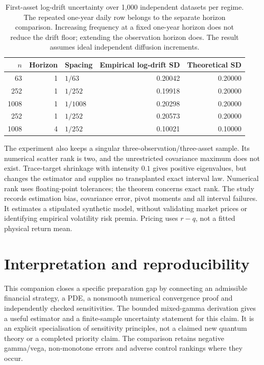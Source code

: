 \documentclass[11pt]{article}
\begin{document}
\begin{table}[tb]\centering\small
\begin{tabular}{rrlrr}\toprule
$n$ & Horizon & Spacing & Empirical log-drift SD & Theoretical SD\\\midrule
63 & 1 & $1/63$ & 0.20042 & 0.20000 \\
252 & 1 & $1/252$ & 0.19918 & 0.20000 \\
1008 & 1 & $1/1008$ & 0.20298 & 0.20000 \\
252 & 1 & $1/252$ & 0.20573 & 0.20000 \\
1008 & 4 & $1/252$ & 0.10021 & 0.10000 \\
\bottomrule\end{tabular}
\caption{First-asset log-drift uncertainty over 1,000 independent datasets per regime. The repeated one-year daily row belongs to the separate horizon comparison. Increasing frequency at a fixed one-year horizon does not reduce the drift floor; extending the observation horizon does. The result assumes ideal independent diffusion increments.}
\label{tab:cgbm-frequency-horizon}\end{table}

The experiment also keeps a singular three-observation/three-asset sample.
Its numerical scatter rank is two, and the unrestricted covariance maximum
does not exist. Trace-target shrinkage with intensity $0.1$ gives positive
eigenvalues, but changes the estimator and supplies no transplanted exact
interval law. Numerical rank uses floating-point tolerances; the theorem
concerns exact rank. The study records estimation bias, covariance error,
pivot moments and all interval failures. It estimates a stipulated synthetic
model, without validating market prices or identifying empirical volatility
risk premia. Pricing uses $r-q$, not a fitted physical return mean.

\section{Interpretation and reproducibility}

This companion closes a specific preparation gap by connecting an
admissible financial strategy, a PDE, a nonsmooth numerical convergence
proof and independently checked sensitivities. The bounded mixed-gamma
derivation gives a useful estimator and a finite-sample uncertainty
statement for this claim. It is an explicit specialisation of sensitivity
principles, not a claimed new quantum theory or a completed priority claim.
The comparison retains negative gamma/vega, non-monotone errors and
adverse control rankings where they occur.
\end{document}
